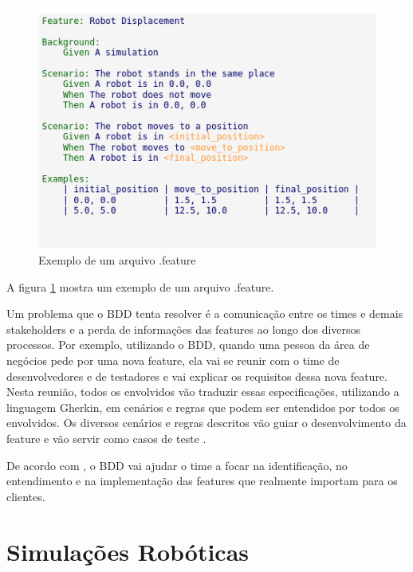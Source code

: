 
\begin{figure}
\centering
\includegraphics[width=\textwidth]{imagens/bddExample.png}
\caption{Exemplo de um arquivo .feature} 
\label{fig:bddExample}
\end{figure}

A figura \ref{fig:bddExample} mostra um exemplo de um arquivo .feature.

Um problema que o BDD tenta resolver é a comunicação entre os times e demais stakeholders e a perda de informações das features ao longo dos diversos processos. Por exemplo, utilizando o BDD, quando uma pessoa da área de negócios pede por uma nova feature, ela vai se reunir com o time de desenvolvedores e de testadores e vai explicar os requisitos dessa nova feature. Nesta reunião, todos os envolvidos vão traduzir essas especificações, utilizando a linguagem Gherkin, em cenários e regras que podem ser entendidos por todos os envolvidos. Os diversos cenários e regras descritos vão guiar o desenvolvimento da feature e vão servir como casos de teste \cite{bddInAction}.

De acordo com \cite{bddInAction}, o BDD vai ajudar o time a focar na identificação, no entendimento e na implementação das features que realmente importam para os clientes.


\section{Simulações Robóticas}

